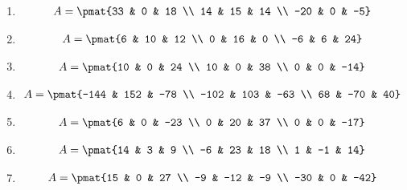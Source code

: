\begin{enumerate}
\item

\begin{align*}
A = \pmat{33 & 0 & 18 \\ 14 & 15 & 14 \\ -20 & 0 & -5}
\end{align*}

\item

\begin{align*}
A = \pmat{6 & 10 & 12 \\ 0 & 16 & 0 \\ -6 & 6 & 24}
\end{align*}

\item

\begin{align*}
A = \pmat{10 & 0 & 24 \\ 10 & 0 & 38 \\ 0 & 0 & -14}
\end{align*}

\item

\begin{align*}
A = \pmat{-144 & 152 & -78 \\ -102 & 103 & -63 \\ 68 & -70 & 40}
\end{align*}

\item

\begin{align*}
A = \pmat{6 & 0 & -23 \\ 0 & 20 & 37 \\ 0 & 0 & -17}
\end{align*}

\item

\begin{align*}
A = \pmat{14 & 3 & 9 \\ -6 & 23 & 18 \\ 1 & -1 & 14}
\end{align*}

\item

\begin{align*}
A = \pmat{15 & 0 & 27 \\ -9 & -12 & -9 \\ -30 & 0 & -42}
\end{align*}


\end{enumerate}
